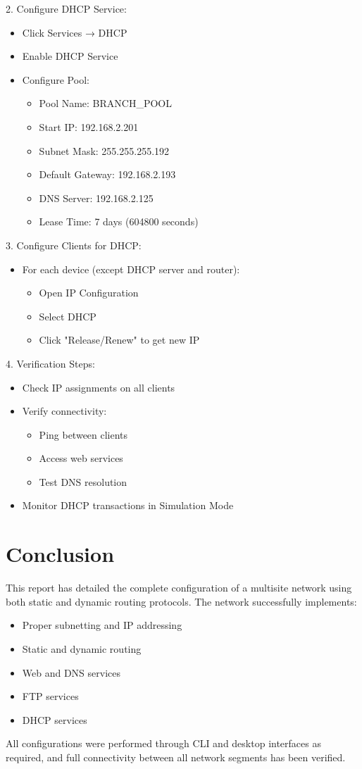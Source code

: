 \documentclass[12pt]{article}
\begin{document}
2. Configure DHCP Service:
   \begin{itemize}
   \item Click Services → DHCP
   \item Enable DHCP Service
   \item Configure Pool:
     \begin{itemize}
     \item Pool Name: BRANCH\_POOL
     \item Start IP: 192.168.2.201
     \item Subnet Mask: 255.255.255.192
     \item Default Gateway: 192.168.2.193
     \item DNS Server: 192.168.2.125
     \item Lease Time: 7 days (604800 seconds)
     \end{itemize}
   \end{itemize}

3. Configure Clients for DHCP:
   \begin{itemize}
   \item For each device (except DHCP server and router):
     \begin{itemize}
     \item Open IP Configuration
     \item Select DHCP
     \item Click "Release/Renew" to get new IP
     \end{itemize}
   \end{itemize}

4. Verification Steps:
   \begin{itemize}
   \item Check IP assignments on all clients
   \item Verify connectivity:
     \begin{itemize}
     \item Ping between clients
     \item Access web services
     \item Test DNS resolution
     \end{itemize}
   \item Monitor DHCP transactions in Simulation Mode
   \end{itemize}

\section{Conclusion}
This report has detailed the complete configuration of a multisite network using both static and dynamic routing protocols. The network successfully implements:
\begin{itemize}
    \item Proper subnetting and IP addressing
    \item Static and dynamic routing
    \item Web and DNS services
    \item FTP services
    \item DHCP services
\end{itemize}

All configurations were performed through CLI and desktop interfaces as required, and full connectivity between all network segments has been verified.
\end{document}

